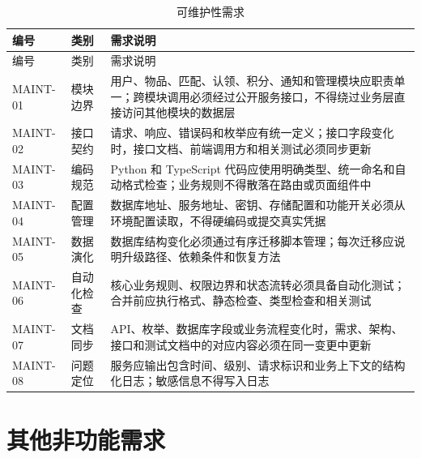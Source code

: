 \small
\begin{longtable}{L{1.7cm} L{3.0cm} L{8.2cm}}
  \caption{可维护性需求}\label{tab:maintainability}\\
  \toprule
  编号 & 类别 & 需求说明 \\
  \midrule
  \endfirsthead
  \toprule
  编号 & 类别 & 需求说明 \\
  \midrule
  \endhead
  MAINT-01 & 模块边界 & 用户、物品、匹配、认领、积分、通知和管理模块应职责单一；跨模块调用必须经过公开服务接口，不得绕过业务层直接访问其他模块的数据层 \\
  MAINT-02 & 接口契约 & 请求、响应、错误码和枚举应有统一定义；接口字段变化时，接口文档、前端调用方和相关测试必须同步更新 \\
  MAINT-03 & 编码规范 & Python 和 TypeScript 代码应使用明确类型、统一命名和自动格式检查；业务规则不得散落在路由或页面组件中 \\
  MAINT-04 & 配置管理 & 数据库地址、服务地址、密钥、存储配置和功能开关必须从环境配置读取，不得硬编码或提交真实凭据 \\
  MAINT-05 & 数据演化 & 数据库结构变化必须通过有序迁移脚本管理；每次迁移应说明升级路径、依赖条件和恢复方法 \\
  MAINT-06 & 自动化检查 & 核心业务规则、权限边界和状态流转必须具备自动化测试；合并前应执行格式、静态检查、类型检查和相关测试 \\
  MAINT-07 & 文档同步 & API、枚举、数据库字段或业务流程变化时，需求、架构、接口和测试文档中的对应内容必须在同一变更中更新 \\
  MAINT-08 & 问题定位 & 服务应输出包含时间、级别、请求标识和业务上下文的结构化日志；敏感信息不得写入日志 \\
  \bottomrule
\end{longtable}
\normalsize

\section{其他非功能需求}

